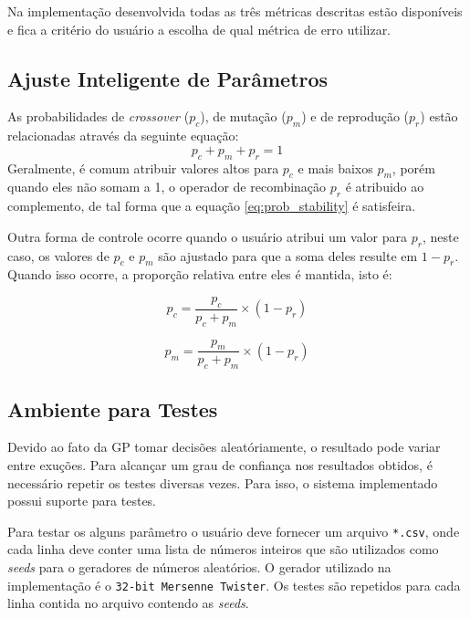 \documentclass[a4paper]{paper}
\begin{document}
Na implementação desenvolvida todas as três métricas descritas estão disponíveis
e fica a critério do usuário a escolha de qual métrica de erro utilizar.

\subsection{Ajuste Inteligente de Parâmetros}\label{subsec:smart_par}

As probabilidades de \textit{crossover} ($p_c$), de mutação ($p_m$) e de reprodução
($p_r$) estão relacionadas através da seguinte equação:
\begin{equation} \label{eq:prob_stability}
  p_c + p_m + p_r = 1
\end{equation}
Geralmente, é comum atribuir valores altos para $p_c$ e mais baixos $p_m$, porém
quando eles não somam a 1, o operador de recombinação $p_r$ é atribuido ao
complemento, de tal forma que a equação \ref{eq:prob_stability} é satisfeira.

Outra forma de controle ocorre quando o usuário atribui um valor para $p_r$, neste
caso, os valores de $p_c$ e $p_m$ são ajustado para que a soma deles resulte em
$1-p_r$. Quando isso ocorre, a proporção relativa entre eles é mantida, isto é:

\noindent\begin{minipage}{.5\linewidth}
  \begin{equation*}
    p_c = \frac{p_c}{p_c+p_m}\times (1-p_r)  
  \end{equation*}
\end{minipage}
\begin{minipage}{.5\linewidth}
  \begin{equation*}
    p_m = \frac{p_m}{p_c+p_m}\times (1-p_r)  
  \end{equation*}
\end{minipage}

\subsection{Ambiente para Testes}

Devido ao fato da GP tomar decisões aleatóriamente, o resultado pode variar
entre exuções. Para alcançar um grau de confiança nos resultados obtidos, é
necessário repetir os testes diversas vezes. Para isso, o sistema implementado
possui suporte para testes.

Para testar os alguns parâmetro o usuário deve fornecer um arquivo \texttt{*.csv},
onde cada linha deve conter uma lista de números inteiros que são utilizados
como \textit{seeds} para o geradores de números aleatórios. O gerador utilizado
na implementação é o \texttt{32-bit Mersenne Twister}. Os testes são repetidos
para cada linha contida no arquivo contendo as \textit{seeds}.
\end{document}
